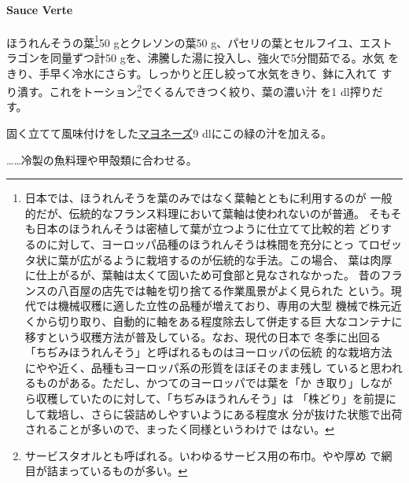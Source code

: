 \begin{recette}
\hypertarget{sauce-verte}{%
\paragraph{Sauce Verte}\label{sauce-verte}}


ほうれんそうの葉\footnote{日本では、ほうれんそうを葉のみではなく葉軸とともに利用するのが
  一般的だが、伝統的なフランス料理において葉軸は使われないのが普通。
  そもそも日本のほうれんそうは密植して葉が立つように仕立てて比較的若
  どりするのに対して、ヨーロッパ品種のほうれんそうは株間を充分にとっ
  てロゼッタ状に葉が広がるように栽培するのが伝統的な手法。この場合、
  葉は肉厚に仕上がるが、葉軸は太くて固いため可食部と見なされなかった。
  昔のフランスの八百屋の店先では軸を切り捨てる作業風景がよく見られた
  という。現代では機械収穫に適した立性の品種が増えており、専用の大型
  機械で株元近くから切り取り、自動的に軸をある程度除去して併走する巨
  大なコンテナに移すという収穫方法が普及している。なお、現代の日本で
  冬季に出回る「ちぢみほうれんそう」と呼ばれるものはヨーロッパの伝統
  的な栽培方法にやや近く、品種もヨーロッパ系の形質をほぼそのまま残し
  ていると思われるものがある。ただし、かつてのヨーロッパでは葉を「か
  き取り」しながら収穫していたのに対して、「ちぢみほうれんそう」は
  「株どり」を前提にして栽培し、さらに袋詰めしやすいようにある程度水
  分が抜けた状態で出荷されることが多いので、まったく同様というわけで
  はない。}50 gとクレソンの葉50 g、パセリの葉とセルフイユ、エスト
ラゴンを同量ずつ計50 gを、沸騰した湯に投入し、強火で5分間茹でる。水気
をきり、手早く冷水にさらす。しっかりと圧し絞って水気をきり、鉢に入れて
すり潰す。これをトーション\footnote{サービスタオルとも呼ばれる。いわゆるサービス用の布巾。やや厚め
  で網目が詰まっているものが多い。}でくるんできつく絞り、葉の濃い汁 を1
dl搾りだす。

固く立てて風味付けをした\protect\hyperlink{mayonnaise}{マヨネーズ}9
dlにこの緑の汁を加える。

\ldots{}\ldots{}冷製の魚料理や甲殻類に合わせる。
\end{recette}